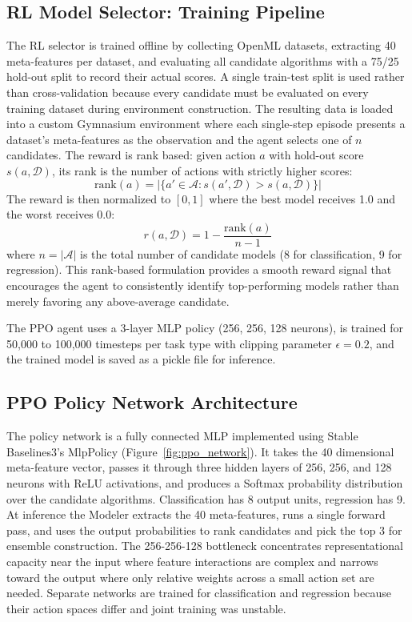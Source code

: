 \documentclass{article}
\begin{document}
\subsection{RL Model Selector: Training Pipeline}

The RL selector is trained offline by collecting OpenML datasets,
extracting 40 meta-features per dataset, and evaluating all candidate
algorithms with a 75/25 hold-out split to record their actual scores. A
single train-test split is used rather than cross-validation because every
candidate must be evaluated on every training dataset during environment
construction. The resulting data is loaded into a custom Gymnasium
environment where each single-step episode presents a dataset's
meta-features as the observation and the agent selects one of $n$
candidates. The reward is rank based: given action $a$ with hold-out score
$s(a, \mathcal{D})$, its rank is the number of actions with strictly higher
scores:
\begin{equation}
\text{rank}(a) = \left| \{ a' \in \mathcal{A} : s(a', \mathcal{D}) > s(a, \mathcal{D}) \} \right|
\end{equation}
The reward is then normalized to $[0, 1]$ where the best model receives 1.0 
and the worst receives 0.0:
\begin{equation}
r(a, \mathcal{D}) = 1 - \frac{\text{rank}(a)}{n - 1}
\end{equation}
where $n = |\mathcal{A}|$ is the total number of candidate models (8 for 
classification, 9 for regression). This rank-based formulation provides a 
smooth reward signal that encourages the agent to consistently identify 
top-performing models rather than merely favoring any above-average candidate.

The PPO agent uses a 3-layer MLP policy (256, 256, 128 neurons), is trained
for 50,000 to 100,000 timesteps per task type with clipping parameter
$\epsilon = 0.2$, and the trained model is saved as a pickle file for
inference.

\subsection{PPO Policy Network Architecture}

The policy network is a fully connected MLP implemented using Stable
Baselines3's MlpPolicy (Figure~\ref{fig:ppo_network}). It takes the 40
dimensional meta-feature vector, passes it through three hidden layers of
256, 256, and 128 neurons with ReLU activations, and produces a Softmax
probability distribution over the candidate algorithms. Classification has
8 output units, regression has 9. At inference the Modeler extracts the 40
meta-features, runs a single forward pass, and uses the output
probabilities to rank candidates and pick the top 3 for ensemble
construction. The 256-256-128 bottleneck concentrates representational
capacity near the input where feature interactions are complex and narrows
toward the output where only relative weights across a small action set
are needed. Separate networks are trained for classification and
regression because their action spaces differ and joint training was
unstable.
\end{document}
